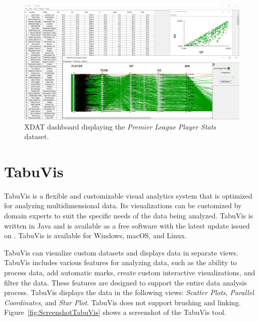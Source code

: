 \begin{figure}[tp]
\centering
\includegraphics[keepaspectratio,width=\linewidth,height=\halfh]
{images/screenshot-xdat.png}

\caption[XDAT Dashboard]
{%
XDAT dashboard displaying the \emph{Premier League Player Stats} dataset.
}
\label{fig:ScreenshotXDAT}
\end{figure}



\section{TabuVis}

TabuVis \parencite{nguyen2013tabuvis} is a flexible and customizable
visual analytics system that is optimized for analyzing multidimensional
data. Its visualizations can be customized by domain experts to suit the
specific needs of the data being analyzed. TabuVis is written in Java and
is available as a free software with the latest update issued on
. TabuVis is available for Windows, macOS, and
Linux.

TabuVis can visualize custom datasets and displays data in separate views.
TabuVis includes various features for analyzing data, such as the ability
to process data, add automatic marks, create custom interactive
visualizations, and filter the data. These features are designed to
support the entire data analysis process. TabuVis displays the data in the
following views: \emph{Scatter Plots}, \emph{Parallel Coordinates}, and
\emph{Star Plot}. TabuVis does not support brushing and linking.
Figure~\ref{fig:ScreenshotTabuVis} shows a screenshot of the TabuVis tool.




